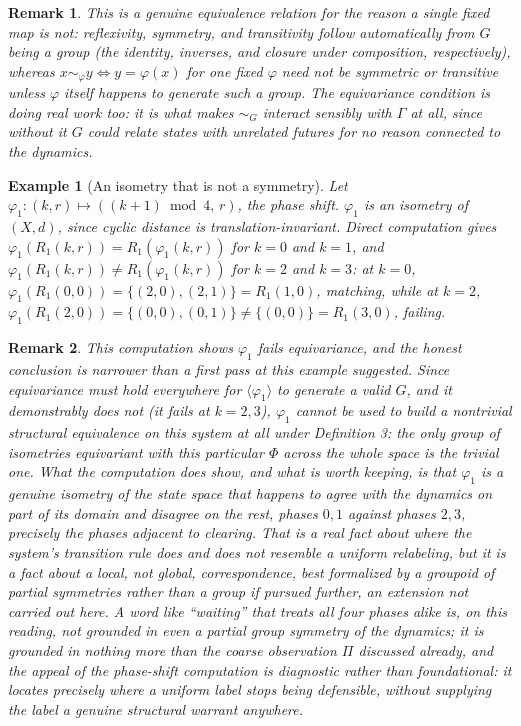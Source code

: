 \documentclass[11pt]{report}
\newtheorem{remark}{Remark}[chapter]
\newtheorem{example}{Example}[chapter]
\begin{document}
\begin{remark}
This is a genuine equivalence relation for the reason a single fixed
map is not: reflexivity, symmetry, and transitivity follow
automatically from $G$ being a group (the identity, inverses, and
closure under composition, respectively), whereas $x \sim_\varphi y
\iff y = \varphi(x)$ for one fixed $\varphi$ need not be symmetric or
transitive unless $\varphi$ itself happens to generate such a group.
The equivariance condition is doing real work too: it is what makes
$\sim_G$ interact sensibly with $\Gamma$ at all, since without it $G$
could relate states with unrelated futures for no reason connected to
the dynamics.
\end{remark}

\begin{example}[An isometry that is not a symmetry]
Let $\varphi_1 : (k,r) \mapsto ((k+1) \bmod 4,\, r)$, the phase shift.
$\varphi_1$ is an isometry of $(X,d)$, since cyclic distance is
translation-invariant. Direct computation gives
$\varphi_1(R_1(k,r)) = R_1(\varphi_1(k,r))$ for $k=0$ and $k=1$, and
$\varphi_1(R_1(k,r)) \neq R_1(\varphi_1(k,r))$ for $k=2$ and $k=3$: at
$k=0$, $\varphi_1(R_1(0,0)) = \{(2,0),(2,1)\} = R_1(1,0)$, matching,
while at $k=2$, $\varphi_1(R_1(2,0)) = \{(0,0),(0,1)\} \neq
\{(0,0)\} = R_1(3,0)$, failing.
\end{example}

\begin{remark}
This computation shows $\varphi_1$ fails equivariance, and the
honest conclusion is narrower than a first pass at this example
suggested. Since equivariance must hold everywhere for $\langle
\varphi_1 \rangle$ to generate a valid $G$, and it demonstrably does
not (it fails at $k=2,3$), $\varphi_1$ cannot be used to build a
nontrivial structural equivalence on this system at all under
Definition 3: the only group of isometries equivariant with this
particular $\Phi$ across the whole space is the trivial one. What the
computation does show, and what is worth keeping, is that $\varphi_1$
is a genuine isometry of the state space that happens to agree with
the dynamics on part of its domain and disagree on the rest, phases
$0,1$ against phases $2,3$, precisely the phases adjacent to
clearing. That is a real fact about where the system's transition
rule does and does not resemble a uniform relabeling, but it is a
fact about a \emph{local}, not global, correspondence, best formalized
by a groupoid of partial symmetries rather than a group if pursued
further, an extension not carried out here. A word like ``waiting''
that treats all four phases alike is, on this reading, not grounded
in even a partial group symmetry of the dynamics; it is grounded in
nothing more than the coarse observation $\Pi$ discussed already, and
the appeal of the phase-shift computation is diagnostic rather than
foundational: it locates precisely where a uniform label stops being
defensible, without supplying the label a genuine structural warrant
anywhere.
\end{remark}
\end{document}
